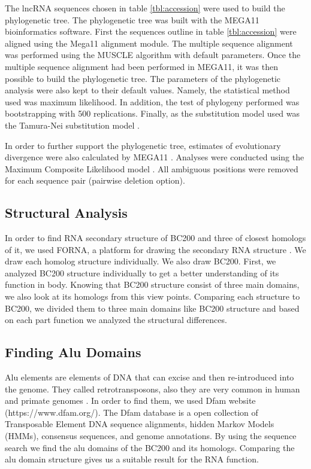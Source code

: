 \documentclass[conference]{IEEEtran}
\begin{document}
The lncRNA sequences chosen in table \ref{tbl:accession} were used to build the phylogenetic tree. 
The phylogenetic tree was built with the MEGA11 \cite{tamura2021mega11} bioinformatics software. 
First the sequences outline in table \ref{tbl:accession} were aligned using the Mega11 alignment module. 
The multiple sequence alignment was performed using the MUSCLE algorithm with default parameters. 
Once the multiple sequence alignment had been performed in MEGA11, it was then possible to build the phylogenetic tree. 
The parameters of the phylogenetic analysis were also kept to their default values. 
Namely, the statistical method used was maximum likelihood. 
In addition, the test of phylogeny performed was bootstrapping with 500 replications.
Finally, as the substitution model used was the Tamura-Nei substitution model \cite{tamura1993estimation}. 

In order to further support the phylogenetic tree, estimates of evolutionary divergence were also calculated by MEGA11 \cite{tamura2021mega11}. 
Analyses were conducted using the Maximum Composite Likelihood model \cite{tamura2004prospects}. 
All ambiguous positions were removed for each sequence pair (pairwise deletion option). 

\subsection{Structural Analysis}\label{sec:structure}

In order to find RNA secondary structure of BC200 and three of closest homologs of it, we used FORNA, a platform for drawing the secondary RNA structure \cite{kerpedjiev2015forna}. 
We draw each homolog structure individually. 
We also draw BC200. 
First, we analyzed BC200 structure individually to get a better understanding of its function in body. 
Knowing that BC200 structure consist of three main domains, we also look at its homologs from this view points. 
Comparing each structure to BC200, we divided them to three main domains like BC200 structure and based on each part function we analyzed the structural differences.

\subsection{Finding Alu Domains}

Alu elements are elements of DNA that can excise and then re-introduced into the genome. 
They called retrotransposons, also they are very common in human and primate genomes \cite{dombroski1994vivo}. 
In order to find them, we used Dfam website (https://www.dfam.org/). 
The Dfam database is a open collection of Transposable Element DNA sequence alignments, hidden Markov Models (HMMs), consensus sequences, and genome annotations. 
By using the sequence search we find the alu domains of the BC200 and its homologs. 
Comparing the alu domain structure gives us a suitable result for the RNA function.
\end{document}
